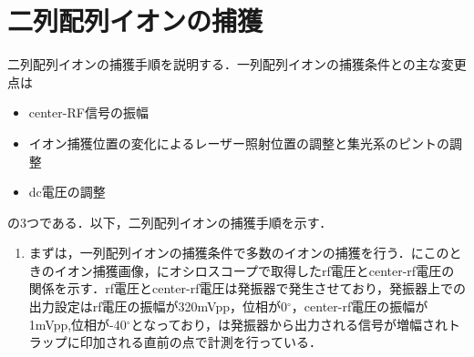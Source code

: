 \section{二列配列イオンの捕獲}
二列配列イオンの捕獲手順を説明する．一列配列イオンの捕獲条件との主な変更点は
\begin{itemize}
	\item center-RF信号の振幅
	\item イオン捕獲位置の変化によるレーザー照射位置の調整と集光系のピントの調整
	\item dc電圧の調整
\end{itemize}
の3つである．以下，二列配列イオンの捕獲手順を示す．\\
\begin{enumerate}
\item まずは，一列配列イオンの捕獲条件で多数のイオンの捕獲を行う．にこのときのイオン捕獲画像，にオシロスコープで取得したrf電圧とcenter-rf電圧の関係を示す．rf電圧とcenter-rf電圧は発振器で発生させており，発振器上での出力設定はrf電圧の振幅が320mVpp，位相が0$^{\circ}$，center-rf電圧の振幅が1mVpp,位相が-40$^{\circ}$となっており，は発振器から出力される信号が増幅されトラップに印加される直前の点で計測を行っている．


\end{enumerate}
